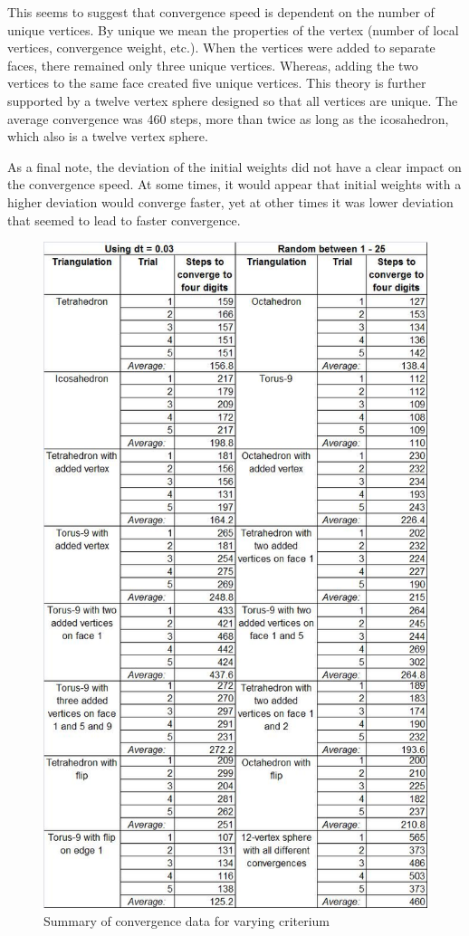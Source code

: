 \documentclass[12pt]{article}
\begin{document}
\noindent This seems to suggest that convergence speed is dependent on the number of unique vertices. By unique we mean the properties of the vertex (number of local vertices, convergence weight, etc.). When the vertices were added to separate faces, there remained only three unique vertices. Whereas, adding the two vertices to the same face created five unique vertices. This theory is further supported by a twelve vertex sphere designed so that all vertices are unique. The average convergence was 460 steps, more than twice as long as the icosahedron, which also is a twelve vertex sphere.\newline

\noindent As a final note, the deviation of the initial weights did not have a clear impact on the convergence speed. At some times, it would appear that initial weights with a higher deviation would converge faster, yet at other times it was lower deviation that seemed to lead to faster convergence.

\begin{figure}
\centering
\includegraphics[scale = 0.79]{ConvergenceTable.png}
\caption{Summary of convergence data for varying criterium}
\label{fig:conv}
\end{figure}
\end{document}
